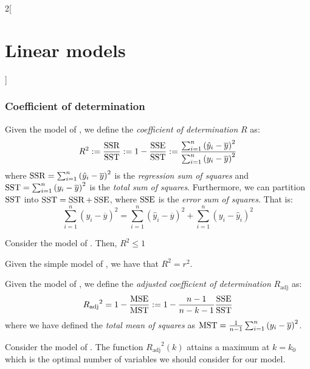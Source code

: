 \documentclass[../../../main_math.tex]{subfiles}
\begin{document}
\begin{multicols}{2}[\section{Linear models}]
  \subsubsection{Coefficient of determination}
  \begin{definition}
    Given the model of , we define the \emph{coefficient of determination} $R$ as:
    $$R^2:=\frac{\operatorname{SSR}}{\operatorname{SST}}:=1-\frac{\operatorname{SSE}}{\operatorname{SST}}:=\frac{\sum_{i=1}^n{(\hat{y}_i-\overline{y})}^2}{\sum_{i=1}^n{(y_i-\overline{y})}^2}$$ where $\operatorname{SSR}=\sum_{i=1}^n{(\hat{y}_i-\overline{y})}^2$ is the \emph{regression sum of squares} and $\operatorname{SST}=\sum_{i=1}^n{(y_i-\overline{y})}^2$ is the \emph{total sum of squares}. Furthermore, we can partition $\operatorname{SST}$ into $\operatorname{SST}=\operatorname{SSR}+\operatorname{SSE}$, where $\operatorname{SSE}$ is the \emph{error sum of squares}. That is: $$\sum_{i=1}^n{(y_i-\overline{y})}^2=\sum_{i=1}^n{(\hat{y}_i-\overline{y})}^2+\sum_{i=1}^n{(y_i-\hat{y}_i)}^2$$
  \end{definition}
  \begin{lemma}
    Consider the model of . Then, $R^2\leq 1$
  \end{lemma}
  \begin{proposition}
    Given the simple model of , we have that $R^2=r^2$.
  \end{proposition}
  \begin{definition}
    Given the model of , we define the \emph{adjusted coefficient of determination} $R_{\mathrm{adj}}$ as: $${R_{\mathrm{adj}}}^2=1-\frac{\operatorname{MSE}}{\operatorname{MST}}:=1-\frac{n-1}{n-k-1}\frac{\operatorname{SSE}}{\operatorname{SST}}$$ where we have defined the \emph{total mean of squares} as $\operatorname{MST}=\frac{1}{n-1}\sum_{i=1}^n{(y_i-\overline{y})}^2$.
  \end{definition}
  \begin{lemma}
    Consider the model of . The function ${R_{\mathrm{adj}}}^2(k)$ attains a maximum at $k=k_0$ which is the optimal number of variables we should consider for our model.
  \end{lemma}

\end{multicols}
\end{document}
